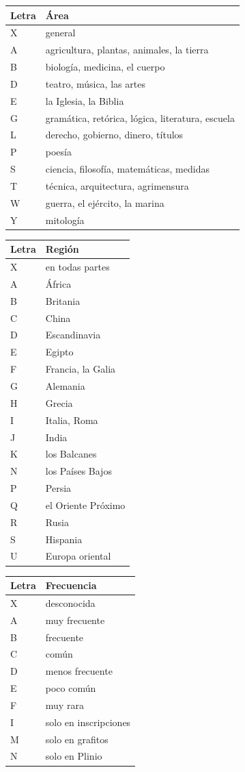 \documentclass[12pt,
              article,
              oneside
              ]{memoir}
\begin{document}
\begin{longtable}{@{}lp{}@{}}
\toprule
Letra & Área\\
\midrule
\endhead
X & general\\
A & agricultura, plantas, animales, la tierra\\
B & biología, medicina, el cuerpo\\
D & teatro, música, las artes\\
E & la Iglesia, la Biblia\\
G & gramática, retórica, lógica, literatura, escuela\\
L & derecho, gobierno, dinero, títulos\\
P & poesía\\
S & ciencia, filosofía, matemáticas, medidas\\
T & técnica, arquitectura, agrimensura\\
W & guerra, el ejército, la marina\\
Y & mitología\\
\bottomrule
\end{longtable}

\begin{longtable}{@{}lp{}@{}}
\toprule
Letra & Región\\
\midrule
\endhead
X & en todas partes\\
A & África\\
B & Britania\\
C & China\\
D & Escandinavia\\
E & Egipto\\
F & Francia, la Galia\\
G & Alemania\\
H & Grecia\\
I & Italia, Roma\\
J & India\\
K & los Balcanes\\
N & los Países Bajos\\
P & Persia\\
Q & el Oriente Próximo\\
R & Rusia\\
S & Hispania\\
U & Europa oriental\\
\bottomrule
\end{longtable}

\begin{longtable}{@{}lp{}@{}}
\toprule
Letra & Frecuencia\\
\midrule
\endhead
X & desconocida\\
A & muy frecuente\\
B & frecuente\\
C & común\\
D & menos frecuente\\
E & poco común\\
F & muy rara\\
I & solo en inscripciones\\
M & solo en grafitos\\
N & solo en Plinio\\
\bottomrule
\end{longtable}
\end{document}
